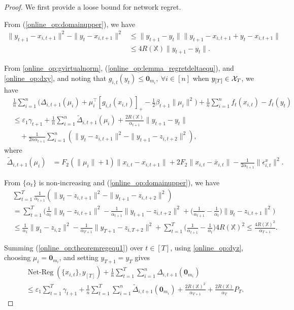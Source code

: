 \documentclass[12pt,draftcls,onecolumn]{IEEEtran}%
\DeclareMathOperator{\NetReg}{Net-Reg}
\begin{document}
\begin{proof}
 We first provide a loose bound for network regret.

From (\ref{online_op:domainupper}), we have
\begin{align}\label{online_op:dxy}
\|y_{t+1}-x_{i,t+1}\|^2-\|y_t-x_{i,t+1}\|^2
&\le\|y_{t+1}-y_t\|\|y_{t+1}-x_{i,t+1}+y_t-x_{i,t+1}\|\nonumber\\
&\le4R(\mathbb{X})\|y_{t+1}-y_t\|.
\end{align}

From \eqref{online_op:gvirtualnorm}, (\ref{online_op:lemma_regretdeltaequ}), and \eqref{online_op:dxy},  and noting that $g_{i,t}(y_t)\le{\bm 0}_{m_i},~\forall i\in[n]$ when $y_{[T]}\in{\mathcal{X}}_{T}$, we have
\begin{align}\label{online_op:theoremregequ1}
&\frac{1}{ n}\sum_{i=1}^n\Big(\Delta_{i,t+1}(\mu_i)+\mu_i^\top[g_{i,t}(x_{i,t})]_+
-\frac{1}{2}\beta_{t+1}\|\mu_i\|^2\Big)+\frac{1}{n}\sum_{i=1}^nf_{t}(x_{i,t})
-f_{t}(y_t)\nonumber\\
&\le \varepsilon_1\gamma_{t+1}+\frac{1}{n}\sum_{i=1}^n
\tilde{\Delta}_{i,t+1}(\mu_i)+\frac{2R(\mathbb{X})}{\alpha_{t+1}}\|y_{t+1}-y_t\|\nonumber\\
&\quad+\frac{1}{ 2n\alpha_{t+1}}\sum_{i=1}^n(\|y_t-z_{i,t+1}\|^2-\|y_{t+1}-z_{i,t+2}\|^2),
\end{align}
where
\begin{align*}
\tilde{\Delta}_{i,t+1}(\mu_i)&=F_2(\|\mu_i\|+1)\|x_{i,t}-x_{i,t+1}\|
+2F_2\|x_{i,t}-\bar{x}_{i,t}\|-\frac{1}{2\alpha_{t+1}}\|\epsilon^x_{i,t}\|^2.
\end{align*}

From $\{\alpha_t\}$ is non-increasing and (\ref{online_op:domainupper}), we have
\begin{align}
&\sum_{t=1}^T\frac{1}{\alpha_{t+1}}(\|y_t-z_{i,t+1}\|^2-\|y_{t+1}-z_{i,t+2}\|^2)\nonumber\\
&=\sum_{t=1}^T\Big(\frac{1}{\alpha_{t}}\|y_t-z_{i,t+1}\|^2-\frac{1}{\alpha_{t+1}}
\|y_{t+1}-z_{i,t+2}\|^2
+\Big(\frac{1}{\alpha_{t+1}}-\frac{1}{\alpha_{t}}\Big)\|y_t-z_{i,t+1}\|^2\Big)\nonumber\\
&\le\frac{1}{\alpha_{1}}\|y_1-z_{i,2}\|^2-\frac{1}{\alpha_{T+1}}\|y_{T+1}-z_{i,T+2}\|^2
+\sum_{t=1}^T\Big(\frac{1}{\alpha_{t+1}}-\frac{1}{\alpha_{t}}\Big)4R(\mathbb{X})^2
\le\frac{4R(\mathbb{X})^2}{\alpha_{T+1}}.\label{online_op:dyz}
\end{align}

Summing (\ref{online_op:theoremregequ1}) over $t\in[T]$, using \eqref{online_op:dyz}, choosing $\mu_i=\bm{0}_{m_i}$, and setting $y_{T+1}=y_{T}$ gives
\begin{align}\label{online_op:theoremregequ2}
&\NetReg(\{x_{i,t}\},y_{[T]})+\frac{1}{n}\sum_{t=1}^T\sum_{i=1}^n
\Delta_{i,t+1}(\bm{0}_{m_i})\nonumber\\
&\le \varepsilon_1\sum_{t=1}^T\gamma_{t+1}
+\frac{1}{n}\sum_{t=1}^{T}\sum_{i=1}^n\tilde{\Delta}_{i,t+1}(\bm{0}_{m_i})
+\frac{2R(\mathbb{X})^2}{\alpha_{T+1}}
+\frac{2R(\mathbb{X})}{\alpha_{T}}P_T.
\end{align}


\end{proof}
\end{document}
